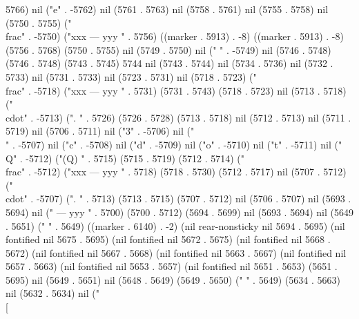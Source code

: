 5766) nil ("e" . -5762) nil (5761 . 5763) nil (5758 . 5761) nil (5755 . 5758) nil (5750 . 5755) ("\\frac" . -5750) ("xxx
---
yyy
" . 5756) ((marker . 5913) . -8) ((marker . 5913) . -8) (5756 . 5768) (5750 . 5755) nil (5749 . 5750) nil (" " . -5749) nil (5746 . 5748) (5746 . 5748) (5743 . 5745) 5744 nil (5743 . 5744) nil (5734 . 5736) nil (5732 . 5733) nil (5731 . 5733) nil (5723 . 5731) nil (5718 . 5723) ("\\frac" . -5718) ("xxx
---
yyy
" . 5731) (5731 . 5743) (5718 . 5723) nil (5713 . 5718) ("\\cdot" . -5713) (".
" . 5726) (5726 . 5728) (5713 . 5718) nil (5712 . 5713) nil (5711 . 5719) nil (5706 . 5711) nil ("3" . -5706) nil ("\\" . -5707) nil ("c" . -5708) nil ("d" . -5709) nil ("o" . -5710) nil ("t" . -5711) nil ("\\Q" . -5712) ("(Q)
" . 5715) (5715 . 5719) (5712 . 5714) ("\\frac" . -5712) ("xxx
---
yyy
" . 5718) (5718 . 5730) (5712 . 5717) nil (5707 . 5712) ("\\cdot" . -5707) (".
" . 5713) (5713 . 5715) (5707 . 5712) nil (5706 . 5707) nil (5693 . 5694) nil ("%
---
yyy
" . 5700) (5700 . 5712) (5694 . 5699) nil (5693 . 5694) nil (5649 . 5651) ("    " . 5649) ((marker . 6140) . -2) (nil rear-nonsticky nil 5694 . 5695) (nil fontified nil 5675 . 5695) (nil fontified nil 5672 . 5675) (nil fontified nil 5668 . 5672) (nil fontified nil 5667 . 5668) (nil fontified nil 5663 . 5667) (nil fontified nil 5657 . 5663) (nil fontified nil 5653 . 5657) (nil fontified nil 5651 . 5653) (5651 . 5695) nil (5649 . 5651) nil (5648 . 5649) (5649 . 5650) ("  " . 5649) (5634 . 5663) nil (5632 . 5634) nil (" \\[


